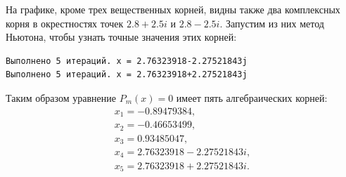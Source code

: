 На графике, кроме трех вещественных корней, видны также два комплексных корня в окрестностях точек $2.8+2.5i$ и $2.8-2.5i$. Запустим из них метод Ньютона, чтобы узнать точные значения этих корней:
\begin{verbatim}
Выполнено 5 итераций. x = 2.76323918-2.27521843j
Выполнено 5 итераций. x = 2.76323918+2.27521843j
\end{verbatim}

Таким образом уравнение $P_m(x) = 0$ имеет пять алгебраических корней:
\begin{gather*}x_1 = -0.89479384,\\
    x_2 = -0.46653499,\\
    x_3 = 0.93485047,\\
    x_4 = 2.76323918-2.27521843i,\\
    x_5 = 2.76323918+2.27521843i.
\end{gather*}
